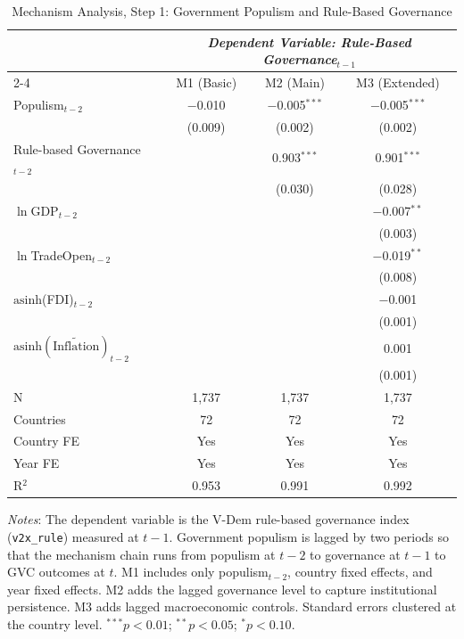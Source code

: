 
\begin{table}[!htbp]
\centering
\caption{Mechanism Analysis, Step 1: Government Populism and Rule-Based Governance}
\label{tab:mech1}
\begin{tabular}{lccc}
\toprule
& \multicolumn{3}{c}{\textit{Dependent Variable: Rule-Based Governance$_{t-1}$}} \\
\cmidrule(lr){2-4}
& M1 (Basic) & M2 (Main) & M3 (Extended) \\
\midrule
Populism$_{t-2}$ & $-$0.010 & $-$0.005$^{***}$ & $-$0.005$^{***}$ \\
& (0.009) & (0.002) & (0.002) \\[4pt]
Rule-based Governance$_{t-2}$ & & 0.903$^{***}$ & 0.901$^{***}$ \\
& & (0.030) & (0.028) \\[4pt]
$\ln$GDP$_{t-2}$ & & & $-$0.007$^{**}$ \\
& & & (0.003) \\[4pt]
$\ln$TradeOpen$_{t-2}$ & & & $-$0.019$^{**}$ \\
& & & (0.008) \\[4pt]
$\text{asinh}$(FDI)$_{t-2}$ & & & $-$0.001 \\
& & & (0.001) \\[4pt]
$\text{asinh}(\widetilde{\text{Inflation}})_{t-2}$ & & & 0.001 \\
& & & (0.001) \\[4pt]
\midrule
N & 1,737 & 1,737 & 1,737 \\
Countries & 72 & 72 & 72 \\
Country FE & Yes & Yes & Yes \\
Year FE & Yes & Yes & Yes \\
R$^2$ & 0.953 & 0.991 & 0.992 \\
\bottomrule
\end{tabular}
\vspace{4pt}
\begin{minipage}{\textwidth}
\footnotesize
\textit{Notes}: The dependent variable is the V-Dem rule-based governance index (\texttt{v2x\_rule}) measured at $t-1$. Government populism is lagged by two periods so that the mechanism chain runs from populism at $t-2$ to governance at $t-1$ to GVC outcomes at $t$. M1 includes only populism$_{t-2}$, country fixed effects, and year fixed effects. M2 adds the lagged governance level to capture institutional persistence. M3 adds lagged macroeconomic controls. Standard errors clustered at the country level. $^{***}p<0.01$; $^{**}p<0.05$; $^{*}p<0.10$.
\end{minipage}
\end{table}

